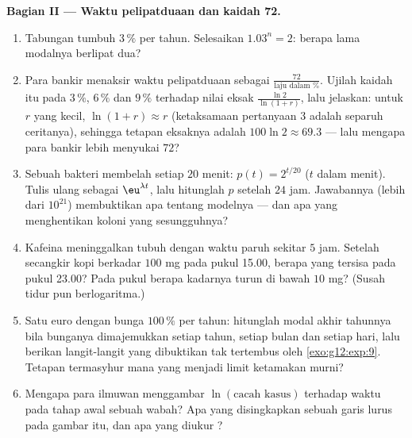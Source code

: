 \begin{problem}
\medskip
\noindent\textbf{Bagian II --- Waktu pelipatduaan dan kaidah
72.}
\begin{enumerate}[resume]
  \item Tabungan tumbuh $3\,\%$ per tahun. Selesaikan
        $1.03^n = 2$: berapa lama modalnya berlipat dua?
  \item Para bankir menaksir waktu pelipatduaan sebagai
        $\frac{72}{\text{laju dalam }\%}$. Ujilah kaidah itu pada
        $3\,\%$, $6\,\%$ dan $9\,\%$ terhadap nilai eksak
        $\frac{\ln 2}{\ln(1 + r)}$, lalu jelaskan: untuk $r$ yang
        kecil, $\ln(1 + r) \approx r$ (ketaksamaan pertanyaan 3 adalah
        separuh ceritanya), sehingga tetapan eksaknya adalah
        $100 \ln 2 \approx 69.3$ --- lalu mengapa para bankir lebih menyukai
        $72$?
  \item Sebuah bakteri membelah setiap $20$ menit:
        $p(t) = 2^{t/20}$ ($t$ dalam menit). Tulis ulang sebagai
        $\eu^{\lambda t}$, lalu hitunglah $p$ setelah $24$ jam.
        Jawabannya (lebih dari $10^{21}$) membuktikan apa tentang
        modelnya --- dan apa yang menghentikan koloni yang sesungguhnya?
  \item Kafeina meninggalkan tubuh dengan waktu paruh sekitar $5$
        jam. Setelah secangkir kopi berkadar $100$ mg pada pukul 15.00, berapa
        yang tersisa pada pukul 23.00? Pada pukul berapa kadarnya turun di
        bawah $10$ mg? (Susah tidur pun berlogaritma.)
  \item Satu euro dengan bunga $100\,\%$ per tahun: hitunglah
        modal akhir tahunnya bila bunganya dimajemukkan setiap tahun, setiap
        bulan dan setiap hari, lalu berikan langit-langit yang dibuktikan tak
        tertembus oleh \cref{exo:g12:exp:9}. Tetapan termasyhur mana
        yang menjadi limit ketamakan murni?
  \item Mengapa para ilmuwan menggambar $\ln(\text{cacah kasus})$ terhadap
        waktu pada tahap awal sebuah wabah? Apa yang disingkapkan sebuah
        garis lurus pada gambar itu, dan apa yang diukur ?
\end{enumerate}


\end{problem}
